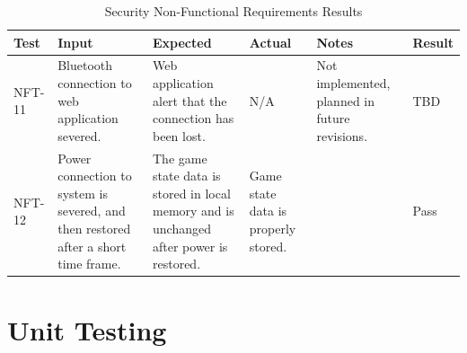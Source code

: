 \documentclass[12pt, titlepage]{article}
\begin{document}
\begin{table}[H]
\centering
    \setlength{\leftmargini}{0.4cm}
    \begin{tabular}{| >{\centering\arraybackslash}m{1cm} | 
        >{\centering\arraybackslash}m{2.5cm} | 
        >{\centering\arraybackslash}m{4cm} | 
        >{\centering\arraybackslash}m{3cm} |
        >{\centering\arraybackslash}m{3cm} |
        >{\centering\arraybackslash}m{1.5cm} |}
    \hline
    \rowcolor[gray]{0.9}
    Test & Input & Expected & Actual & Notes & Result\\
    \hline
    NFT-11 & Bluetooth connection to web application severed. & Web application alert that the connection has been lost. & N/A & Not implemented, planned in future revisions. & TBD \\
    \hline
    NFT-12 & Power connection to system is severed, and then restored after a short time frame. & The game state data is stored in local memory and is unchanged after power is restored. & Game state data is properly stored. &  & Pass \\
    \hline
    \end{tabular}
\caption{Security Non-Functional Requirements Results}
\end{table}

\section{Unit Testing} \label{UnitTest}
\end{document}
